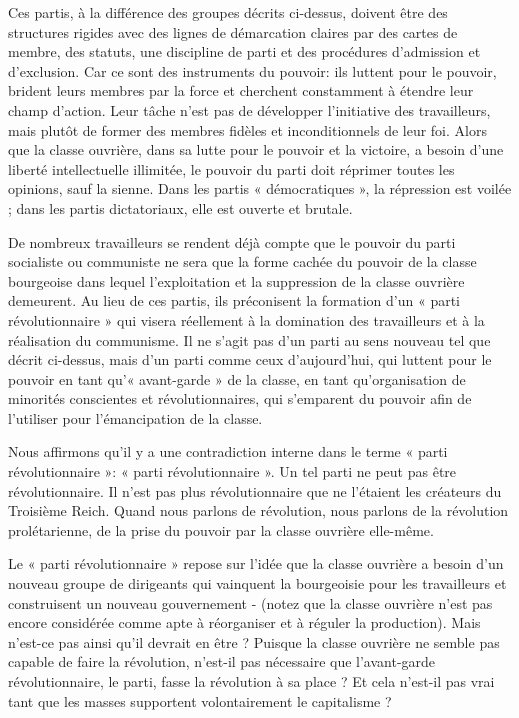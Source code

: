 Ces partis, à la différence des groupes décrits ci-dessus, doivent être des structures rigides avec des lignes de démarcation claires par des cartes de membre, des statuts, une discipline de parti et des procédures d'admission et d'exclusion. Car ce sont des instruments du pouvoir: ils luttent pour le pouvoir, brident leurs membres par la force et cherchent constamment à étendre leur champ d'action. Leur tâche n'est pas de développer l'initiative des travailleurs, mais plutôt de former des membres fidèles et inconditionnels de leur foi. Alors que la classe ouvrière, dans sa lutte pour le pouvoir et la victoire, a besoin d'une liberté intellectuelle illimitée, le pouvoir du parti doit réprimer toutes les opinions, sauf la sienne. Dans les partis « démocratiques », la répression est voilée ; dans les partis dictatoriaux, elle est ouverte et brutale.

De nombreux travailleurs se rendent déjà compte que le pouvoir du parti socialiste ou communiste ne sera que la forme cachée du pouvoir de la classe bourgeoise dans lequel l'exploitation et la suppression de la classe ouvrière demeurent. Au lieu de ces partis, ils préconisent la formation d'un « parti révolutionnaire » qui visera réellement à la domination des travailleurs et à la réalisation du communisme. Il ne s'agit pas d'un parti au sens nouveau tel que décrit ci-dessus, mais d'un parti comme ceux d'aujourd'hui, qui luttent pour le pouvoir en tant qu'« avant-garde » de la classe, en tant qu'organisation de minorités conscientes et révolutionnaires, qui s'emparent du pouvoir afin de l'utiliser pour l'émancipation de la classe.

Nous affirmons qu'il y a une contradiction interne dans le terme « parti révolutionnaire »: « parti révolutionnaire ». Un tel parti ne peut pas être révolutionnaire. Il n'est pas plus révolutionnaire que ne l'étaient les créateurs du Troisième Reich. Quand nous parlons de révolution, nous parlons de la révolution prolétarienne, de la prise du pouvoir par la classe ouvrière elle-même.

Le « parti révolutionnaire » repose sur l'idée que la classe ouvrière a besoin d'un nouveau groupe de dirigeants qui vainquent la bourgeoisie pour les travailleurs et construisent un nouveau gouvernement - (notez que la classe ouvrière n'est pas encore considérée comme apte à réorganiser et à réguler la production). Mais n'est-ce pas ainsi qu'il devrait en être ? Puisque la classe ouvrière ne semble pas capable de faire la révolution, n'est-il pas nécessaire que l'avant-garde révolutionnaire, le parti, fasse la révolution à sa place ? Et cela n'est-il pas vrai tant que les masses supportent volontairement le capitalisme ?

